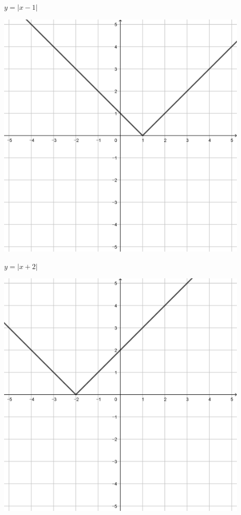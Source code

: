 \documentclass[a4paper]{oblivoir}
\begin{document}
\clearpage
\begin{minipage}{0.45\textwidth}\centering
\(y=|x-1|\)
\par\bigskip\includegraphics[width=0.9\textwidth]{img/16-1}
\end{minipage}
\begin{minipage}{0.45\textwidth}\centering
\(y=|x+2|\)
\par\bigskip\includegraphics[width=0.9\textwidth]{img/16-2}
\end{minipage}\bigskip\bigskip\par
\end{document}
